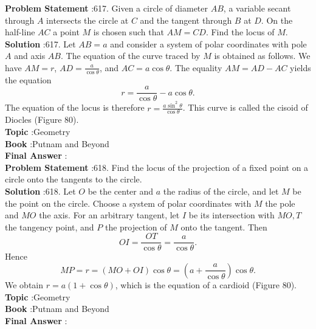 \documentclass[10pt]{article}
\begin{document}
\textbf{Problem Statement} :617. Given a circle of diameter $A B$, a variable secant through $A$ intersects the circle at $C$ and the tangent through $B$ at $D$. On the half-line $A C$ a point $M$ is chosen such that $A M=C D$. Find the locus of $M$. \\
\textbf{Solution} :617. Let $A B=a$ and consider a system of polar coordinates with pole $A$ and axis $A B$. The equation of the curve traced by $M$ is obtained as follows. We have $A M=r$, $A D=\frac{a}{\cos \theta}$, and $A C=a \cos \theta$. The equality $A M=A D-A C$ yields the equation$$ r=\frac{a}{\cos \theta}-a \cos \theta . $$The equation of the locus is therefore $r=\frac{a \sin ^{2} \theta}{\cos \theta}$. This curve is called the cisoid of Diocles (Figure 80).\\
\textbf{Topic} :Geometry\\
\textbf{Book} :Putnam and Beyond\\
\textbf{Final Answer} :\\


\textbf{Problem Statement} :618. Find the locus of the projection of a fixed point on a circle onto the tangents to the circle.\\
\textbf{Solution} :618. Let $O$ be the center and $a$ the radius of the circle, and let $M$ be the point on the circle. Choose a system of polar coordinates with $M$ the pole and $M O$ the axis. For an arbitrary tangent, let $I$ be its intersection with $M O, T$ the tangency point, and $P$ the projection of $M$ onto the tangent. Then$$ O I=\frac{O T}{\cos \theta}=\frac{a}{\cos \theta} . $$Hence$$ M P=r=(M O+O I) \cos \theta=\left(a+\frac{a}{\cos \theta}\right) \cos \theta . $$We obtain $r=a(1+\cos \theta)$, which is the equation of a cardioid (Figure 80).\\
\textbf{Topic} :Geometry\\
\textbf{Book} :Putnam and Beyond\\
\textbf{Final Answer} :\\
\end{document}
